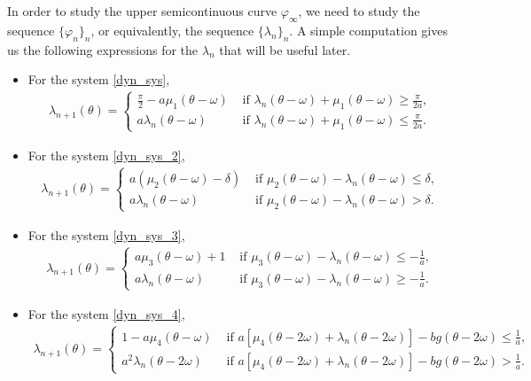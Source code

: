 \documentclass[12pt]{article}
\theoremstyle{plain}
\theoremstyle{remark}
\theoremstyle{definition}
\begin{document}
In order to study the upper semicontinuous curve $\varphi_\infty$, we need to study the sequence $\{\varphi_n\}_n$, or equivalently, the sequence $\{\lambda_n\}_n$. A simple computation gives us the following expressions for the $\lambda_n$ that will be useful later.
\begin{itemize}
    \item For the system \eqref{dyn_sys},
    \begin{align*}
        \lambda_{n+1}(\theta) =
        \begin{cases}
            \frac{\pi}{2} - a\mu_1(\theta-\omega) &\text{ if }\lambda_n(\theta-\omega) + \mu_1(\theta-\omega)\geq\frac{\pi}{2a},\\
             a\lambda_n(\theta-\omega) &\text{ if }\lambda_n(\theta-\omega) + \mu_1(\theta-\omega)\leq\frac{\pi}{2a}.
        \end{cases}
    \end{align*}
    \item For the system \eqref{dyn_sys_2},
    \begin{align*}
        \lambda_{n+1}(\theta) =
            \begin{cases}
                a(\mu_2(\theta-\omega)-\delta) &\text{ if }\mu_2(\theta-\omega)-\lambda_n(\theta-\omega)\leq \delta,\\
                a\lambda_n(\theta-\omega) &\text{ if }\mu_2(\theta-\omega)-\lambda_n(\theta-\omega)>\delta.
            \end{cases}
    \end{align*}
    \item For the system \eqref{dyn_sys_3},
    \begin{align*}
        \lambda_{n+1}(\theta) =
        \begin{cases}
            a\mu_3(\theta-\omega)+1 &\text{ if }\mu_3(\theta-\omega)-\lambda_n(\theta-\omega)\leq -\frac{1}{a},\\
            a\lambda_n(\theta-\omega) &\text{ if }\mu_3(\theta-\omega)-\lambda_n(\theta-\omega)\geq -\frac{1}{a}.
        \end{cases}
    \end{align*}
    \item For the system \eqref{dyn_sys_4},
    \begin{align}\label{expression_lambda_4}
        \lambda_{n+1}(\theta) =
        \begin{cases}
            1 - a\mu_4(\theta-\omega) &\text{ if }a[\mu_4(\theta-2\omega)+\lambda_n(\theta-2\omega)] - b g(\theta-2\omega)\leq\frac{1}{a},\\
            a^2\lambda_n(\theta-2\omega) &\text{ if }a[\mu_4(\theta-2\omega)+\lambda_n(\theta-2\omega)] - b g(\theta-2\omega)>\frac{1}{a}.
        \end{cases}
    \end{align}
\end{itemize}
\end{document}
